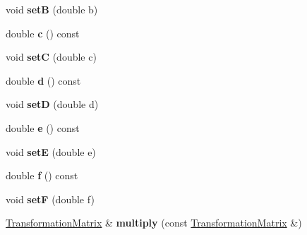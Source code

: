 \begin{DoxyCompactItemize}
\item 
\mbox{\label{class_web_core_1_1_transformation_matrix_a7c9234f326f1e2379119c1eb8f86ba1f}} 
void {\bfseries setB} (double b)
\item 
\mbox{\label{class_web_core_1_1_transformation_matrix_a495669b6105fff14a592141beb220d73}} 
double {\bfseries c} () const
\item 
\mbox{\label{class_web_core_1_1_transformation_matrix_a7048345453203464ca121b6e59ea11a7}} 
void {\bfseries setC} (double c)
\item 
\mbox{\label{class_web_core_1_1_transformation_matrix_aa79b6dcc8dd52100031f6d3e39b9bca2}} 
double {\bfseries d} () const
\item 
\mbox{\label{class_web_core_1_1_transformation_matrix_ad33825ea15442ee7297c9d64d391f72d}} 
void {\bfseries setD} (double d)
\item 
\mbox{\label{class_web_core_1_1_transformation_matrix_a08e5bd2aecab30bec14a73a12761ec39}} 
double {\bfseries e} () const
\item 
\mbox{\label{class_web_core_1_1_transformation_matrix_a16ac6e001a668dc80062c5bac90543cc}} 
void {\bfseries setE} (double e)
\item 
\mbox{\label{class_web_core_1_1_transformation_matrix_a2d721f33a62a2b0b44e6757d7752f74d}} 
double {\bfseries f} () const
\item 
\mbox{\label{class_web_core_1_1_transformation_matrix_a41b35d4f5b63df0cee882c96cb2075c0}} 
void {\bfseries setF} (double f)
\item 
\mbox{\label{class_web_core_1_1_transformation_matrix_a96081a70c7be96a05518adf2a5d58e67}} 
\mbox{\hyperlink{class_web_core_1_1_transformation_matrix}{Transformation\+Matrix}} \& {\bfseries multiply} (const \mbox{\hyperlink{class_web_core_1_1_transformation_matrix}{Transformation\+Matrix}} \&)

\end{DoxyCompactItemize}

